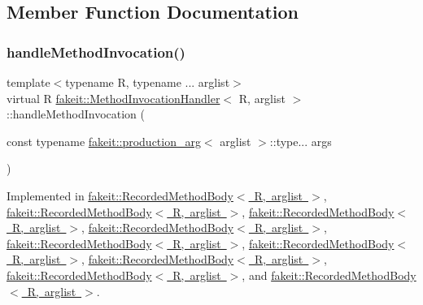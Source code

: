 \subsection{Member Function Documentation}
\mbox{\label{structfakeit_1_1MethodInvocationHandler_a6ef3fe1e948c1886a085bd948d61f730}} 
\subsubsection{\texorpdfstring{handleMethodInvocation()}{handleMethodInvocation()}\hspace{0.1cm}{\footnotesize\ttfamily [1/9]}}
{\footnotesize\ttfamily template$<$typename R, typename ... arglist$>$ \\
virtual R \mbox{\hyperlink{structfakeit_1_1MethodInvocationHandler}{fakeit\+::\+Method\+Invocation\+Handler}}$<$ R, arglist $>$\+::handle\+Method\+Invocation (\begin{DoxyParamCaption}\item[{const typename \mbox{\hyperlink{structfakeit_1_1production__arg}{fakeit\+::production\+\_\+arg}}$<$ arglist $>$\+::type...}]{args }\end{DoxyParamCaption})\hspace{0.3cm}{\ttfamily [pure virtual]}}



Implemented in \mbox{\hyperlink{classfakeit_1_1RecordedMethodBody_a7ba17fdfe96f573c1d3992433a50d170}{fakeit\+::\+Recorded\+Method\+Body$<$ R, arglist $>$}}, \mbox{\hyperlink{classfakeit_1_1RecordedMethodBody_a7ba17fdfe96f573c1d3992433a50d170}{fakeit\+::\+Recorded\+Method\+Body$<$ R, arglist $>$}}, \mbox{\hyperlink{classfakeit_1_1RecordedMethodBody_a7ba17fdfe96f573c1d3992433a50d170}{fakeit\+::\+Recorded\+Method\+Body$<$ R, arglist $>$}}, \mbox{\hyperlink{classfakeit_1_1RecordedMethodBody_a7ba17fdfe96f573c1d3992433a50d170}{fakeit\+::\+Recorded\+Method\+Body$<$ R, arglist $>$}}, \mbox{\hyperlink{classfakeit_1_1RecordedMethodBody_a7ba17fdfe96f573c1d3992433a50d170}{fakeit\+::\+Recorded\+Method\+Body$<$ R, arglist $>$}}, \mbox{\hyperlink{classfakeit_1_1RecordedMethodBody_a7ba17fdfe96f573c1d3992433a50d170}{fakeit\+::\+Recorded\+Method\+Body$<$ R, arglist $>$}}, \mbox{\hyperlink{classfakeit_1_1RecordedMethodBody_a7ba17fdfe96f573c1d3992433a50d170}{fakeit\+::\+Recorded\+Method\+Body$<$ R, arglist $>$}}, \mbox{\hyperlink{classfakeit_1_1RecordedMethodBody_a7ba17fdfe96f573c1d3992433a50d170}{fakeit\+::\+Recorded\+Method\+Body$<$ R, arglist $>$}}, and \mbox{\hyperlink{classfakeit_1_1RecordedMethodBody_a7ba17fdfe96f573c1d3992433a50d170}{fakeit\+::\+Recorded\+Method\+Body$<$ R, arglist $>$}}.

